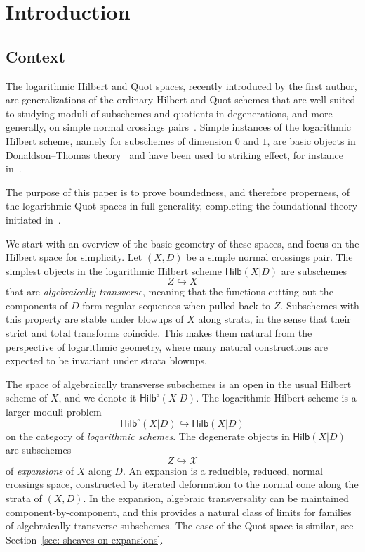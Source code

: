 \documentclass[11pt]{amsart}
\theoremstyle{definition}
\theoremstyle{definition}
\begin{document}
   
	\maketitle 
	\tableofcontents
 
\section*{Introduction}

\subsection{Context} The logarithmic Hilbert and Quot spaces, recently introduced by the first author, are generalizations of the ordinary Hilbert and Quot schemes that are well-suited to studying moduli of subschemes and quotients in degenerations, and more generally, on simple normal crossings pairs~\cite{Logquot}. Simple instances of the logarithmic Hilbert scheme, namely for subschemes of dimension $0$ and $1$, are basic objects in Donaldson--Thomas theory~\cite{LiWu,MR20,MR23} and have been used to striking effect, for instance in~\cite{PP17}. 

The purpose of this paper is to prove boundedness, and therefore properness, of the logarithmic Quot spaces in full generality, completing the foundational theory initiated in~\cite{Logquot}.

We start with an overview of the basic geometry of these spaces, and focus on the Hilbert space for simplicity. Let $(X,D)$ be a simple normal crossings pair. The simplest objects in the logarithmic Hilbert scheme $\mathsf{Hilb}(X|D)$ are subschemes
\[
Z\hookrightarrow X
\]
that are {\it algebraically transverse}, meaning that the functions cutting out the components of $D$ form regular sequences when pulled back to $Z$. Subschemes with this property are stable under blowups of $X$ along strata, in the sense that their strict and total transforms coincide. This makes them natural from the perspective of logarithmic geometry, where many natural constructions are expected to be invariant under strata blowups.  

The space of algebraically transverse subschemes is an open in the usual Hilbert scheme of $X$, and we denote it $\mathsf{Hilb}^\circ(X|D)$. The logarithmic Hilbert scheme is a larger moduli problem
\[
\mathsf{Hilb}^\circ(X|D)\hookrightarrow \mathsf{Hilb}(X|D)
\]
on the category of {\it logarithmic schemes}. The degenerate objects in $\mathsf{Hilb}(X|D)$ are subschemes
\[
Z\hookrightarrow \mathcal X
\]
of {\it expansions} of $X$ along $D$. An expansion is a reducible, reduced, normal crossings space, constructed by iterated deformation to the normal cone along the strata of $(X,D)$. In the expansion, algebraic transversality can be maintained component-by-component, and this provides a natural class of limits for families of algebraically transverse subschemes. The case of the Quot space is similar, see Section~\ref{sec: sheaves-on-expansions}. 
\end{document}
